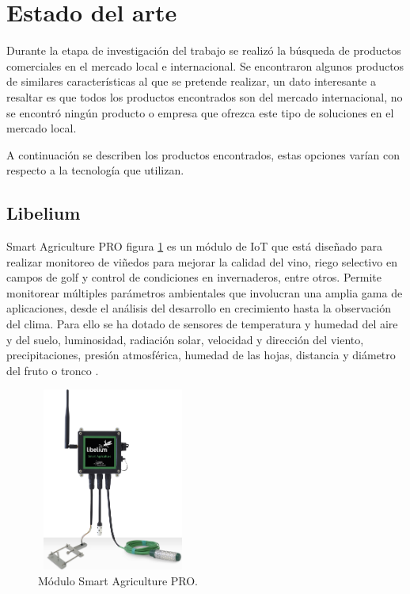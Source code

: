 \section{Estado del arte}

Durante la etapa de investigación del trabajo se realizó la búsqueda de productos comerciales en el mercado local e internacional.
Se encontraron algunos productos de similares características al que se pretende realizar, un dato interesante a resaltar es que todos los productos encontrados son del mercado internacional, no se encontró ningún producto o empresa que ofrezca este tipo de soluciones
en el mercado local.

A continuación se describen los productos encontrados, estas opciones varían con respecto a la tecnología que utilizan.

\subsection{Libelium}

Smart Agriculture PRO figura \ref{fig:Modulo-libelium} es un módulo de IoT que está diseñado para realizar monitoreo de viñedos para mejorar la calidad del vino, riego selectivo en campos de golf y control de condiciones en invernaderos, entre otros.
Permite monitorear múltiples parámetros ambientales que involucran una amplia gama de aplicaciones, desde el análisis del desarrollo en crecimiento hasta la observación del clima. Para ello se ha dotado de sensores de temperatura y humedad del aire y del suelo, luminosidad, radiación solar, velocidad y dirección del viento, precipitaciones, presión atmosférica, humedad de las hojas, distancia y diámetro del fruto o tronco \citep{ModuloAgriculture}.
\vspace{1cm}

\begin{figure}[htbp]
	\centering
	\includegraphics[width=5cm, height=6cm]{./Figures/modulo_libelium.png}
	\caption{Módulo Smart Agriculture PRO.}
	\label{fig:Modulo-libelium}
\end{figure}
\vspace{1cm}

